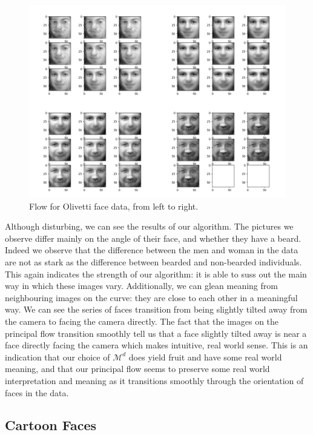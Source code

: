 \documentclass[12pt]{report}
\begin{document}
\begin{figure}[h]
    \begin{center}
        \includegraphics[scale=0.2]{main_olivetti.png}
        \caption{Flow for Olivetti face data, from left to right.}
        \label{fig:olivettiflows}
    \end{center}
\end{figure}

Although disturbing, we can see the results of our algorithm. The pictures we observe 
differ mainly on the angle of their face, and whether they have a beard. Indeed
we observe that the difference between the men and woman in the data are not as stark
as the difference between bearded and non-bearded individuals. 
This again indicates the strength of our algorithm: it is able to suss out the 
main way in which these images vary.
Additionally, we can glean meaning from neighbouring images on the curve:
they are close to each other in a meaningful way. 
We can see the series of faces transition from being slightly tilted away from
the camera to facing the camera directly. The fact that the images on the principal flow
transition smoothly tell us that a face slightly tilted away is near a face directly facing
the camera which makes intuitive, real world sense.
This is an indication that our choice of $\mathcal{M}^d$ does yield fruit and
have some real world meaning, and that our principal flow seems to preserve some
real world interpretation and meaning as it transitions smoothly through the orientation
of faces in the data.

\iffalse
\subsection{Cartoon Faces}
\end{document}
